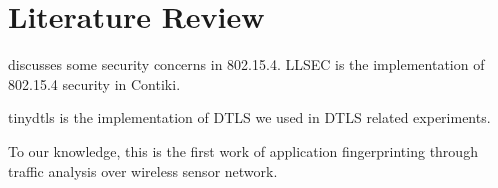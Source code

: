 \chapter{Literature Review}
\cite{802154Sec} discusses some security concerns in 802.15.4.  LLSEC\cite{LLSEC} is the implementation of 802.15.4 security in Contiki.

tinydtls\cite{tinydtls} is the implementation of DTLS we used in DTLS related experiments.

To our knowledge, this is the first work of application fingerprinting through traffic analysis over wireless sensor network.
